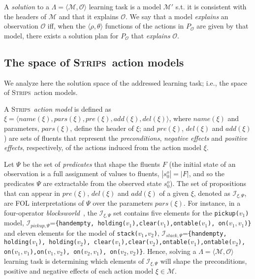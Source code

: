 \documentclass[runningheads]{llncs}
\newcommand{\tup}[1]{{\langle #1 \rangle}}
\newcommand{\strips}{\textsc{Strips}}     %
\begin{document}
A {\em solution} to a $\Lambda=\tup{\mathcal{M},{\mathcal O}}$ learning task is a model $\mathcal{M}'$ s.t. it is consistent with the headers of $\mathcal{M}$ and that it explains $\mathcal{O}$. We say that a model {\em explains} an observation $\mathcal{O}$ iff, when the $\tup{\rho,\theta}$ functions of the actions in $P_\mathcal{O}$ are given by that model, there exists a solution plan for $P_\mathcal{O}$ that {\em explains} $\mathcal{O}$.  

\subsection{The space of \strips\ action models}
\label{sec:strips-space}
We analyze here the solution space of the addressed learning task; i.e., the space of \strips\ action models.

A \strips\ \emph{action model} is defined as $\xi=\tup{name(\xi),pars(\xi),pre(\xi),add(\xi),del(\xi)}$, where $name(\xi)$ and parameters, $pars(\xi)$, define the header of $\xi$; and $pre(\xi)$, $del(\xi)$ and $add(\xi)$) are sets of fluents that represent the {\em preconditions}, {\em negative effects} and {\em positive effects}, respectively, of the actions induced from the action model $\xi$.

Let $\Psi$ be the set of {\em predicates} that shape the fluents $F$ (the initial state of an observation is a full assignment of values to fluents, $|s_0^o|=|F|$, and so the predicates $\Psi$ are extractable from the observed state $s_0^o$). The set of propositions that can appear in $pre(\xi)$, $del(\xi)$ and $add(\xi)$ of a given $\xi$, denoted as ${\mathcal I}_{\xi,\Psi}$, are FOL interpretations of $\Psi$ over the parameters $pars(\xi)$. For instance, in a four-operator {\em blocksworld}~\cite{slaney2001blocks}, the ${\mathcal I}_{\xi,\Psi}$ set contains five elements for the {\small \tt pickup($v_1$)} model, ${\mathcal I}_{pickup,\Psi}$={\small\tt\{handempty, holding($v_1$),clear($v_1$),ontable($v_1$), on($v_1,v_1$)\}} and eleven elements for the model of {\small \tt stack($v_1$,$v_2$)}, ${\mathcal I}_{stack,\Psi}$={\small\tt\{handempty, holding($v_1$), holding($v_2$), clear($v_1$),clear($v_2$),ontable($v_1$),ontable($v_2$), on($v_1,v_1$),on($v_1,v_2$), on($v_2,v_1$), on($v_2,v_2$)\}}. Hence, solving a $\Lambda=\tup{\mathcal{M},{\mathcal O}}$ learning task is determining which elements of ${\mathcal I}_{\xi,\Psi}$ will shape the preconditions, positive and negative effects of each action model $\xi\in \mathcal{M}$.
\end{document}
